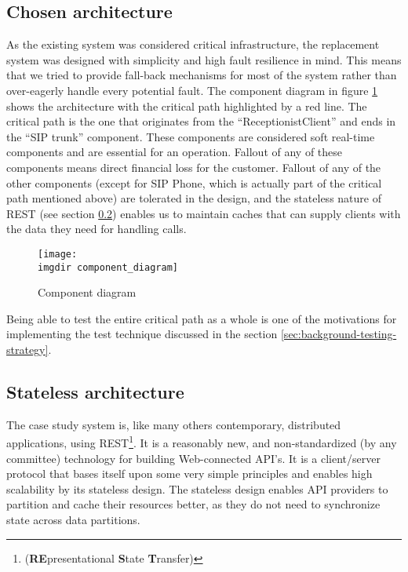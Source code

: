\subsection{Chosen architecture}
As the existing system was considered critical infrastructure, the replacement system was designed with simplicity and high fault resilience in mind. This means that we tried to provide fall-back mechanisms for most of the system rather than over-eagerly handle every potential fault. The component diagram in figure \ref{fig:component_diagram} shows the architecture with the critical path highlighted by a red line. The critical path is the one that originates from the ``ReceptionistClient'' and ends in the ``SIP trunk'' component. These components are considered soft real-time components and are essential for an operation. Fallout of any of these components means direct financial loss for the customer. Fallout of any of the other components (except for SIP Phone, which is actually part of the critical path mentioned above) are tolerated in the design, and the stateless nature of REST (see section \ref{sec:rest}) enables us to maintain caches that can supply clients with the data they need for handling calls.\medskip

\begin{figure}[ht]
\centering
\texttt{[image: \\imgdir component\_diagram]}
\caption{Component diagram}
\label{fig:component_diagram}
\end{figure}

\noindent Being able to test the entire critical path as a whole is one of the motivations for implementing the test technique discussed in the section \ref{sec:background-testing-strategy}.

\subsection{Stateless architecture}
\label{sec:rest}
The case study system is, like many others contemporary, distributed applications, using REST\footnote{(\textbf{RE}presentational \textbf{S}tate \textbf{T}ransfer)}. It is a reasonably new, and non-standardized (by any committee) technology for building Web-connected API's. It is a client/server protocol that bases itself upon some very simple principles and enables high scalability by its stateless design. The stateless design enables API providers to partition and cache their resources better, as they do not need to synchronize state across data partitions.\smallskip

